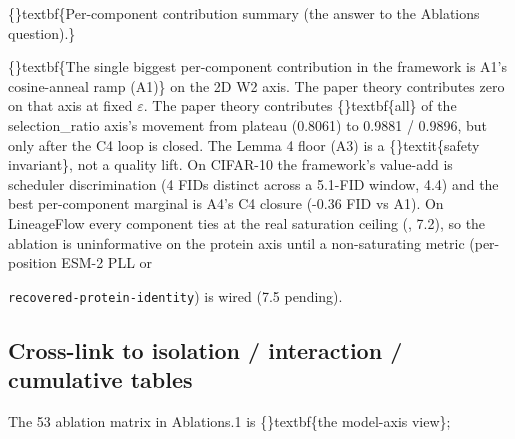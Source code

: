 \documentclass{article}
\begin{document}
\{\}textbf\{Per-component contribution summary (the answer to the Ablations question).\}

\begin{table}[ht]
\centering
\small
{}%
\end{table}

\{\}textbf\{The single biggest per-component contribution in the framework is A1's cosine-anneal ramp (A1)\} on the 2D W2 axis. The paper theory contributes zero on that axis at fixed $\varepsilon$. The paper theory contributes \{\}textbf\{all\} of the selection\_ratio axis's movement from plateau (0.8061) to 0.9881 / 0.9896, but only after the C4 loop is closed. The Lemma 4 floor (A3) is a \{\}textit\{safety invariant\}, not a quality lift. On CIFAR-10 the framework's value-add is scheduler discrimination (4 FIDs distinct across a 5.1-FID window, 4.4) and the best per-component marginal is A4's C4 closure (-0.36 FID vs A1). On LineageFlow every component ties at the real saturation ceiling (, 7.2), so the ablation is uninformative on the protein axis until a non-saturating metric (per-position ESM-2 PLL or

\texttt{recovered-protein-identity}) is wired (7.5 pending).

\subsection{Cross-link to isolation / interaction / cumulative tables}
The 53 ablation matrix in Ablations.1 is \{\}textbf\{the model-axis view\};
\end{document}
